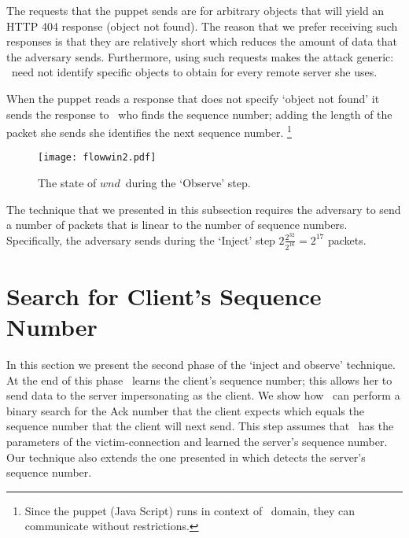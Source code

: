 \documentclass[conference]{IEEEtran}
\newcommand{\wnd}{$\textit{wnd}$}
\begin{document}
The requests that the puppet sends are for arbitrary objects that will yield an HTTP 404 response (object not found). The reason that we prefer receiving such responses is that they are relatively short which reduces the amount of data that the adversary sends. Furthermore, using such requests makes the attack generic: \mal\ need not identify specific objects to obtain for every remote server she uses.

When the puppet reads a response that does not specify `object not found' it sends the response to \mal\ who finds the sequence number; adding the length of the packet she sends she identifies the next sequence number. \footnote{Since the puppet (Java Script) runs in context of \mal\ domain, they can communicate without restrictions.}

\begin{figure}
  \begin{center}
    \texttt{[image: flowwin2.pdf]}
  \end{center}
  \caption{The state of \wnd\ during the `Observe' step.}
    \label{fig:flowcontrolwin2}
\end{figure}

The technique that we presented in this subsection requires the adversary to send a number of packets that is linear to the number of sequence numbers. Specifically, the adversary sends during the `Inject' step $2\frac{2^{32}}{2^{16}} = 2^{17}$ packets.











\section{Search for Client's Sequence Number}\label{Injection:AckEsposure}
In this section we present the second phase of the `inject and observe' technique. At the end of this phase \mal\ learns the client's sequence number; this allows her to send data to the server impersonating as the client. We show how \mal\ can perform a binary search for the Ack number that the client expects which equals the sequence number that the client will next send. This step assumes that \mal\ has the parameters of the victim-connection and learned the server's sequence number. Our technique also extends the one presented in \cite{snptcp} which detects the server's sequence number.
\end{document}
